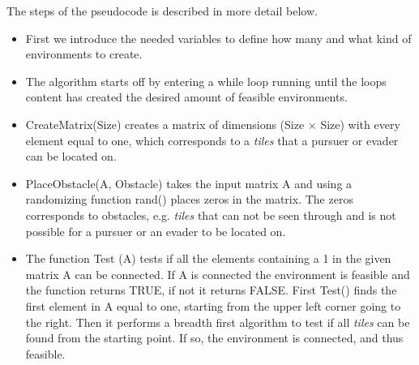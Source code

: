 The steps of the pseudocode is described in more detail below.
\begin{itemize}
\item First we introduce the needed variables to define how many and what kind of environments to create. 
\item The algorithm starts off by entering a while loop running until the loops content has created the desired amount of feasible environments. 
\item CreateMatrix(Size) creates a matrix of dimensions (Size $\times$ Size) with every element equal to one, which corresponds to a \emph{tiles} that a pursuer or evader can be located on.
\item PlaceObstacle(A, Obstacle) takes the input matrix A and using a randomizing function rand() places zeros in the matrix. The zeros corresponds to obstacles, e.g. \emph{tiles} that can not be seen through and is not possible for a pursuer or an evader to be located on.
\item The function Test (A) tests if all the elements containing a 1 in the given matrix A can be connected. If A is connected the environment is feasible and the function returns TRUE, if not it returns FALSE. First Test() finds the first element in A equal to one, starting from the upper left corner going to the right. Then it performs a breadth first algorithm to test if all \emph{tiles} can be found from the starting point. If so, the environment is connected, and thus feasible.
\end{itemize}
